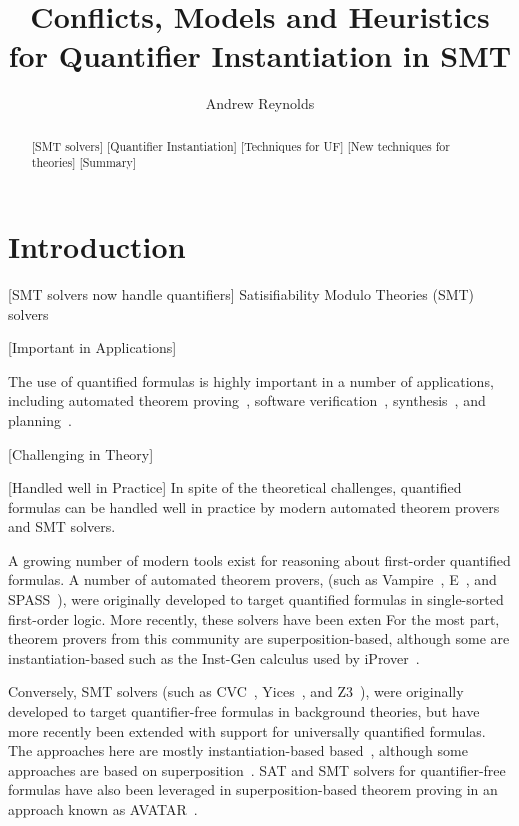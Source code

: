 \documentclass[oribibl]{llncs}
\begin{document}
\title{Conflicts, Models and Heuristics for Quantifier Instantiation in SMT}

\author {Andrew Reynolds}

\maketitle

\pagestyle{plain}

\begin{abstract}
[SMT solvers]
[Quantifier Instantiation]
[Techniques for UF]
[New techniques for theories]
[Summary]
\end{abstract}

\section{Introduction}

[SMT solvers now handle quantifiers]
Satisifiability Modulo Theories (SMT) solvers 

[Important in Applications]

The use of quantified formulas is highly important in a number of applications,
including automated theorem proving~\cite{}, software verification~\cite{}, synthesis~\cite{}, and planning~\cite{}.

[Challenging in Theory]


[Handled well in Practice]
In spite of the theoretical challenges, quantified formulas
can be handled well in practice by modern automated theorem provers and SMT solvers.


A growing number of modern tools exist for reasoning about first-order quantified formulas.
A number of automated theorem provers,
(such as Vampire~\cite{}, E~\cite{}, and SPASS~\cite{}), were originally developed to target 
quantified formulas in single-sorted first-order logic.
More recently, these solvers have been exten
For the most part, theorem provers from this community are superposition-based,
although some are instantiation-based such as the Inst-Gen calculus used by iProver~\cite{}.

Conversely, SMT solvers (such as CVC~\cite{}, Yices~\cite{}, and Z3~\cite{}), 
were originally developed to target quantifier-free formulas in background theories,
but have more recently been extended with support for universally quantified formulas.
The approaches here are mostly instantiation-based based~\cite{},
although some approaches are based on superposition~\cite{}.
SAT and SMT solvers for quantifier-free formulas have also been leveraged in
superposition-based theorem proving in an approach known as AVATAR~\cite{}.
\end{document}

